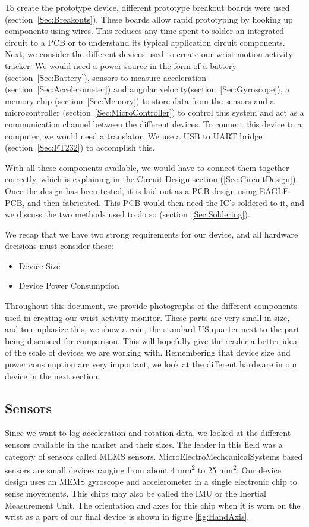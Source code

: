 To create the prototype device, different prototype breakout boards were used (section~\ref{Sec:Breakouts}). These boards allow rapid prototyping by hooking up components using wires. This reduces any time spent to solder an integrated circuit to a PCB or to understand its typical application circuit components. Next, we consider the different devices used to create our wrist motion activity tracker. We would need a power source in the form of a battery (section~\ref{Sec:Battery}), sensors to measure acceleration (section~\ref{Sec:Accelerometer}) and angular velocity(section~\ref{Sec:Gyroscope}), a memory chip (section~\ref{Sec:Memory}) to store data from the sensors and a microcontroller (section~\ref{Sec:MicroController}) to control this system and act as a communication channel between the different devices. To connect this device to a computer, we would need a translator. We use a USB to UART bridge (section~\ref{Sec:FT232}) to accomplish this.

With all these components available, we would have to connect them together correctly, which is explaining in the Circuit Design section (\ref{Sec:CircuitDesign}). Once the design has been tested, it is laid out as a PCB design using EAGLE PCB, and then fabricated. This PCB would then need the IC's soldered to it, and we discuss the two methods used to do so (section~\ref{Sec:Soldering}).

We recap that we have two strong requirements for our device, and all hardware decisions must consider these:
\begin{itemize}
  \item Device Size
  \item Device Power Consumption
\end{itemize}

Throughout this document,
we provide photographs of the different components used in creating our wrist activity monitor.
These parts are very small in size,
and to emphasize this,
we show a coin,
the standard US quarter next to the part being discuseed for comparison.
This will hopefully give the reader a better idea of the scale of devices we are working with.
Remembering that device size and power consumption are very important,
we look at the different hardware in our device in the next section.

\subsection{Sensors}
Since we want to log acceleration and rotation data, we looked at the different sensors available in the market and their sizes. The leader in this field was a category of sensors called MEMS sensors. MicroElectroMechcanicalSystems based sensors are small devices ranging from about 4 mm\textsuperscript{2} to  25 mm\textsuperscript{2}. Our device design uses an MEMS gyroscope and accelerometer in a single electronic chip to sense movements. This chips may also be called the IMU or the Inertial Measurement Unit. The orientation and axes for this chip when it is worn on the wrist as a part of our final device is shown in figure \ref{fig:HandAxis}.

